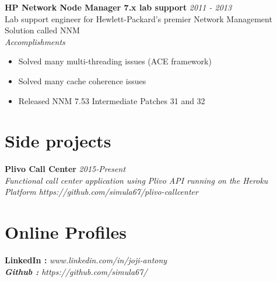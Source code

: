 \documentclass[line,margin]{res}
\begin{document}
\begin{resume}
{\bf HP Network Node Manager 7.x lab support} \hfill {\it{2011 - 2013}}\\
Lab support engineer for Hewlett-Packard's premier Network Management Solution called NNM\\


{\it{Accomplishments}}\\
\begin{itemize}
\item Solved many multi-threading issues (ACE framework)
\item Solved many cache coherence issues
\item Released NNM 7.53 Intermediate Patches 31 and 32
\end{itemize}


\section{Side projects}
{\bf Plivo Call Center} \hfill \it{2015-Present}\\
Functional call center application using Plivo API running on the Heroku Platform
https://github.com/simula67/plivo-callcenter\\

\section{Online Profiles}
{\bf LinkedIn :} \it{www.linkedin.com/in/joji-antony} \\
{\bf Github :} \it{https://github.com/simula67/} \\

\end{resume}
\end{document}
